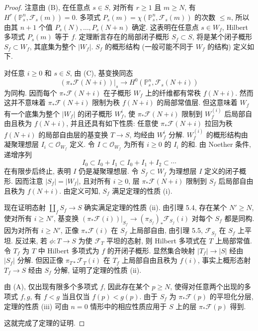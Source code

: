 \begin{proof}
注意由 (B), 在任意点 $s\in S$, 对所有 $r\geq1$ 且 $m\geq N$, 有 $H^r(\mathbb P^n_s,\mathcal F_s(m))=0$. 多项式 $P_s(m)=\chi(\mathbb P^n_s,\mathcal F_s(m))$ 的次数 $\leq n$, 所以由其 $n+1$ 个值 $P_s(N),\ldots,P_s(N+n)$ 确定. 这表明在任意点 $s\in W_f$, Hilbert 多项式 $P_s(m)$ 等于 $f$. 定理断言存在的局部闭子概形 $S_f\subset S$, 将是某个闭子概形 $S_f\subset W_f$, 其底集为整个 $|W_f|$. $S_f$ 的概形结构 (一般可能不同于 $W_f$ 的结构) 定义如下.

对任意 $i\geq0$ 和 $s\in S$, 由 (C), 基变换同态
\[
 (\pi_*\mathcal F(N+i))|_s\longrightarrow H^0(\mathbb P^n_s,\mathcal F_s(N+i))
\]
为同构. 因而每个 $\pi_*\mathcal F(N+i)$ 在子概形 $W_f$ 上的纤维都有常秩 $f(N+i)$. 然而这并不意味着 $\pi_*\mathcal F(N+i)$ 限制为秩 $f(N+i)$ 的局部常值层. 但这意味着 $W_f$ 有一个底集为整个 $|W_f|$ 的闭子概形 $W_f^i$, 使 $\pi_*\mathcal F(N+i)$ 限制到 $W_f^{(i)}$ 后局部自由且秩为 $f(N+i)$, 并且还具有如下性质: 任意使 $\pi_*\mathcal F(N+i)$ 拉回为秩 $f(N+i)$ 的局部自由层的基变换 $T\to S$, 均经由 $W_f^i$ 分解. $W_f^{(i)}$ 的概形结构由凝聚理想层 $I_i\subset\mathcal O_{W_f}$ 定义. 令 $I\subset\mathcal O_{W_f}$ 为所有 $i\geq0$ 的 $I_i$ 的和. 由 Noether 条件, 递增序列
\[
 I_0\subset I_0+I_1\subset I_0+I_1+I_2\subset\cdots
\]
在有限步后终止, 表明 $I$ 仍是凝聚理想层. 令 $S_f\subset W_f$ 为理想层 $I$ 定义的闭子概形. 因而注意 $|S_f|=|W_f|$, 且对所有 $i\geq0$, 层 $\pi_*\mathcal F(N+i)$ 限制到 $S_f$ 后局部自由且秩为 $f(N+i)$.
由定义可知, $S_f$ 满足定理的性质 (i).

现在证明态射 $\coprod_fS_f\to S$ 确实满足定理的性质 (ii). 由引理 5.4, 存在某个 $N'\geq N$, 使对所有 $i\geq N'$, 基变换 $(\pi_*\mathcal F(i))|_{S_f}\to(\pi_{S_f})_*\mathcal F_{S_f}(i)$ 对每个 $S_f$ 都是同构. 因为对所有 $i\geq N'$, 正像 $\pi_*\mathcal F(i)$ 在 $S_f$ 上局部自由, 由引理 5.5, $\mathcal F_{S_f}$ 在 $S_f$ 上平坦. 反过来, 若 $\phi:T\to S$ 为使 $\mathcal F_T$ 平坦的态射, 则 Hilbert 多项式在 $T$ 上局部常值. 令 $T_f$ 为 $T$ 中 Hilbert 多项式为 $f$ 的开闭子概形. 显然集合映射 $|T_f|\to|S|$ 经由 $|S_f|$ 分解. 但因正像 $\pi_{T*}\mathcal F_T(i)$ 在 $T_f$ 上局部自由且秩为 $f(i)$, 事实上概形态射 $T_f\to S$ 经由 $S_f$ 分解, 证明了定理的性质 (ii).

由 (A), 仅出现有限多个多项式 $f$, 因此存在某个 $p\geq N$, 使得对任意两个出现的多项式 $f,g$, 有 $f<g$ 当且仅当 $f(p)<g(p)$. 由于 $S_f$ 为 $\pi_*\mathcal F(p)$ 的平坦化分层, 定理的性质 (iii) 可由 $n=0$ 情形中的相应性质应用于 $S$ 上的层 $\pi_*\mathcal F(p)$ 得到.

这就完成了定理的证明.
\end{proof}

